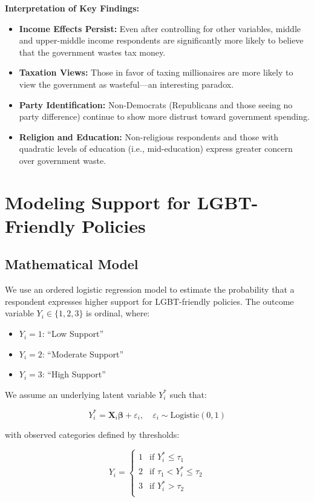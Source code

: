 \documentclass{article}
\begin{document}
\noindent
\textbf{Interpretation of Key Findings:}
\begin{itemize}
  \item \textbf{Income Effects Persist:} Even after controlling for other variables, middle and upper-middle income respondents are significantly more likely to believe that the government wastes tax money.
  \item \textbf{Taxation Views:} Those in favor of taxing millionaires are more likely to view the government as wasteful—an interesting paradox.
  \item \textbf{Party Identification:} Non-Democrats (Republicans and those seeing no party difference) continue to show more distrust toward government spending.
  \item \textbf{Religion and Education:} Non-religious respondents and those with quadratic levels of education (i.e., mid-education) express greater concern over government waste.
\end{itemize}

\section{Modeling Support for LGBT-Friendly Policies}

\subsection{Mathematical Model}

We use an ordered logistic regression model to estimate the probability that a respondent expresses higher support for LGBT-friendly policies. The outcome variable \( Y_i \in \{1, 2, 3\} \) is ordinal, where:

\begin{itemize}
  \item \( Y_i = 1 \): ``Low Support''
  \item \( Y_i = 2 \): ``Moderate Support''
  \item \( Y_i = 3 \): ``High Support''
\end{itemize}

We assume an underlying latent variable \( Y_i^* \) such that:

\[
Y_i^* = \mathbf{X}_i \boldsymbol{\beta} + \varepsilon_i, \quad \varepsilon_i \sim \text{Logistic}(0,1)
\]

with observed categories defined by thresholds:

\[
Y_i = 
\begin{cases}
1 & \text{if } Y_i^* \leq \tau_1 \\
2 & \text{if } \tau_1 < Y_i^* \leq \tau_2 \\
3 & \text{if } Y_i^* > \tau_2 \\
\end{cases}
\]
\end{document}
